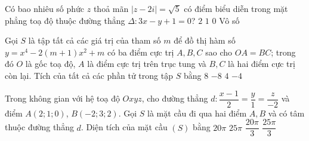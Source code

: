 	\begin{ex}%
		Có bao nhiêu số phức $z$ thoả mãn $|z-2i|=\sqrt{5}$ có điểm biểu diễn trong mặt phẳng toạ độ thuộc đường thẳng $\Delta: 3x-y+1=0$?
		\choice
		{\True $2$}
		{$1$}
		{$0$}
		{Vô số}
	\end{ex}
	
	\begin{ex}%
		Gọi $S$ là tập tất cả các giá trị của tham số $m$ để đồ thị hàm số $y=x^4-2(m+1)x^2+m$ có ba điểm cực trị $A, B, C$ sao cho $OA=BC$; trong đó $O$ là gốc toạ độ, $A$ là điểm cực trị trên trục tung và $B, C$ là hai điểm cực trị còn lại. Tích của tất cả các phần tử trong tập $S$ bằng
		\choice
		{$8$}
		{$-8$}
		{$4$}
		{\True $-4$}
	\end{ex}
	
	\begin{ex}%
		Trong không gian với hệ toạ độ $Oxyz$, cho đường thẳng $d: \dfrac{x-1}{2}=\dfrac{y}{1}=\dfrac{z}{-2}$ và điểm $A(2;1;0)$, $B(-2;3;2)$. Gọi $S$ là mặt cầu đi qua hai điểm $A, B$ và có tâm thuộc đường thẳng $d$. Diện tích của mặt cầu $(S)$ bằng
		\choice
		{\True $20\pi$}
		{$25\pi$}
		{$\dfrac{20\pi}{3}$}
		{$\dfrac{25\pi}{3}$}
	\end{ex}
	
